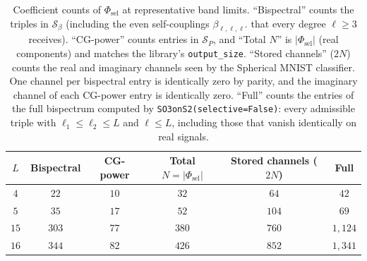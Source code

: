 \documentclass{article}
\theoremstyle{definition}
\theoremstyle{remark}
\theoremstyle{definition}
\begin{document}
\begin{table}[h]
  \caption{Coefficient counts of $\Phi_{\mathrm{sel}}$ at
    representative band limits. ``Bispectral'' counts the triples in
    $\mathcal{S}_\beta$ (including the even self-couplings $\beta_{\ell,\ell,\ell'}$ that every degree
    $\ell\ge 3$ receives).
    ``CG-power'' counts entries in $\mathcal{S}_P$, and ``Total $N$'' is
    $|\Phi_{\mathrm{sel}}|$ (real components) and matches the
    library's \texttt{output\_size}. ``Stored channels'' ($2N$) counts the real and imaginary
    channels seen by the Spherical MNIST classifier.
    One channel per bispectral entry is identically zero by
    parity, and the imaginary channel of each CG-power entry is
    identically zero. ``Full'' counts the entries of the full
    bispectrum computed by \texttt{SO3onS2(selective=False)}: every
    admissible triple with $\ell_1\le\ell_2\le L$ and $\ell\le L$,
    including those that vanish identically on real signals.}
  \label{tab:app-counts}
  \centering
  \small
  \setlength{\tabcolsep}{5pt}
  \begin{tabular}{cccccc}
    \toprule
    $L$ & Bispectral & CG-power & Total $N=|\Phi_{\mathrm{sel}}|$
        & Stored channels ($2N$) & Full \\
    \midrule
    $4$  & $22$  & $10$  & $32$  & $64$  & $42$ \\
    $5$  & $35$  & $17$  & $52$  & $104$ & $69$ \\
    $15$ & $303$ & $77$  & $380$ & $760$ & $1{,}124$ \\
    $16$ & $344$ & $82$  & $426$ & $852$ & $1{,}341$ \\
    \bottomrule
  \end{tabular}
\end{table}
\end{document}
